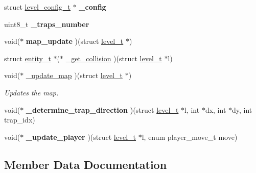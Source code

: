 \begin{DoxyCompactItemize}
\item 
struct \hyperlink{structlevel__config__t}{level\+\_\+config\+\_\+t} $\ast$ {\bfseries \+\_\+config}\hypertarget{structlevel__t_a6f73c3ccae1254dbee52d46d9f633f50}{}\label{structlevel__t_a6f73c3ccae1254dbee52d46d9f633f50}

\item 
uint8\+\_\+t {\bfseries \+\_\+traps\+\_\+number}\hypertarget{structlevel__t_afe48bbd9058a3ac7ab4b79ccb885dcfe}{}\label{structlevel__t_afe48bbd9058a3ac7ab4b79ccb885dcfe}

\item 
void($\ast$ {\bfseries map\+\_\+update} )(struct \hyperlink{structlevel__t}{level\+\_\+t} $\ast$)\hypertarget{structlevel__t_aaeb4f8d72599f896fdfcc35664d8bb57}{}\label{structlevel__t_aaeb4f8d72599f896fdfcc35664d8bb57}

\item 
struct \hyperlink{structentity__t}{entity\+\_\+t} $\ast$($\ast$ \hyperlink{structlevel__t_aaffeed5326370cd0b642502aeb23d6e3}{\+\_\+get\+\_\+collision} )(struct \hyperlink{structlevel__t}{level\+\_\+t} $\ast$l)
\item 
void($\ast$ \hyperlink{structlevel__t_a9f0b48b9b539ac2b3eef575ed9654479}{\+\_\+update\+\_\+map} )(struct \hyperlink{structlevel__t}{level\+\_\+t} $\ast$)\hypertarget{structlevel__t_a9f0b48b9b539ac2b3eef575ed9654479}{}\label{structlevel__t_a9f0b48b9b539ac2b3eef575ed9654479}

\begin{DoxyCompactList}\small\item\em Updates the map. \end{DoxyCompactList}\item 
void($\ast$ {\bfseries \+\_\+determine\+\_\+trap\+\_\+direction} )(struct \hyperlink{structlevel__t}{level\+\_\+t} $\ast$l, int $\ast$dx, int $\ast$dy, int trap\+\_\+idx)\hypertarget{structlevel__t_aac841473df735c9213664d23c618da6e}{}\label{structlevel__t_aac841473df735c9213664d23c618da6e}

\item 
void($\ast$ {\bfseries \+\_\+update\+\_\+player} )(struct \hyperlink{structlevel__t}{level\+\_\+t} $\ast$l, enum player\+\_\+move\+\_\+t move)\hypertarget{structlevel__t_a05348823440a8f8a3977c0f050862e87}{}\label{structlevel__t_a05348823440a8f8a3977c0f050862e87}

\end{DoxyCompactItemize}


\subsection{Member Data Documentation}
